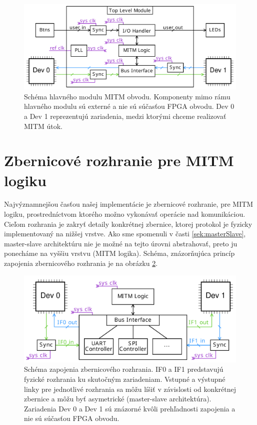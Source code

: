 \begin{figure}
    \centerline{\includegraphics[width=1\textwidth]{images/designs/topLevelModule.pdf}}
    \caption[Schéma hlavného modulu MITM obvodu]{Schéma hlavného modulu MITM obvodu. Komponenty mimo rámu hlavného modulu sú externé a nie sú súčasťou FPGA obvodu. Dev 0 a Dev 1 reprezentujú zariadenia, medzi ktorými chceme realizovať MITM útok.}
    \label{obr:topLevelModule}
\end{figure}

\section{Zbernicové rozhranie pre MITM logiku} \label{sek:busInterface}
Najvýznamnejšou časťou našej implementácie je zbernicové rozhranie, pre MITM logiku, prostredníctvom ktorého možno vykonávať operácie nad komunikáciou. Cieľom rozhrania je zakryť detaily konkrétnej zbernice, ktorej protokol je fyzicky implementovaný na nižšej vrstve. Ako sme spomenuli v časti \ref{sek:masterSlave}, master-slave architektúru nie je možné na tejto úrovni abstrahovať, preto ju ponecháme na vyššiu vrstvu (MITM logika). Schéma, znázorňujúca princíp zapojenia zbernicového rozhrania je na obrázku \ref{obr:busInterface}.

\begin{figure}
    \centerline{\includegraphics[width=1\textwidth]{images/designs/busInterface.pdf}}
    \caption[Schéma zapojenia zbernicového rozhrania]{Schéma zapojenia zbernicového rozhrania. IF0 a IF1 predstavujú fyzické rozhrania ku skutočným zariadeniam. Vstupné a výstupné linky pre jednotlivé rozhrania sa môžu líšiť v závislosti od konkrétnej zbernice a môžu byť asymetrické (master-slave architektúra). Zariadenia Dev 0 a Dev 1 sú znázorné kvôli prehľadnosti zapojenia a nie sú súčasťou FPGA obvodu.}
    \label{obr:busInterface}
\end{figure}

